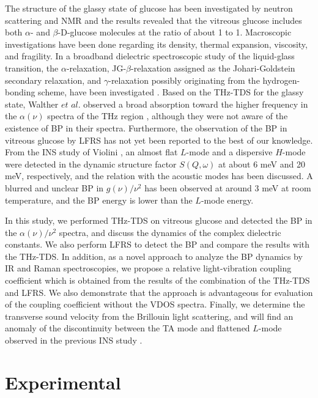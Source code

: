 \documentclass[%
 reprint,
superscriptaddress,
 amsmath,amssymb,
 aps,
prb,
]{revtex4-1}
\begin{document}
The structure of the glassy state of glucose has been investigated by neutron scattering and NMR \cite{Tromp1997} and the results revealed that the vitreous glucose includes both $\alpha$- and $\beta$-D-glucose molecules \cite{Brown1979, Chu1968} at the ratio of about 1 to 1.
Macroscopic investigations have been done regarding its density\cite{Parks1928}, thermal expansion\cite{Parks1934}, viscosity\cite{Parks1934, Ollett1990}, and fragility\cite{Angel1994}.
In a broadband dielectric spectroscopic study \cite{Chan1986, Nole1992, Kaminski2006} of the liquid-glass transition, the $\alpha$-relaxation, JG-$\beta$-relaxation assigned as the Johari-Goldstein secondary relaxation, and $\gamma$-relaxation possibly originating from the hydrogen-bonding scheme, have been investigated \cite{Kaminski2006}.
Based on the THz-TDS for the glassy state, Walther $et$ $al$. observed a broad absorption toward the higher frequency in the $\alpha(\nu)$ spectra of the THz region \cite{Walther2003}, although they were not aware of the existence of BP in their spectra.
Furthermore, the observation of the BP in vitreous glucose by LFRS  has not yet been reported to the best of our knowledge.
From the INS study of Violini \cite{Violini2012}, an almost flat $L$-mode and a dispersive $H$-mode were detected in the dynamic structure factor $S(Q,\omega)$ at about 6 meV and 20 meV, respectively, and the relation with the acoustic modes has been discussed. A blurred and unclear BP in $g(\nu)/\nu^{2}$ has been observed at around 3 meV at room temperature, and the BP energy is lower than the $L$-mode energy.

In this study, we performed THz-TDS on vitreous glucose and detected the BP in the $\alpha(\nu)/\nu^{2}$ spectra, and discuss the dynamics of the complex dielectric constants.
We also perform LFRS to detect the BP and compare the results with the THz-TDS.
In addition, as a novel approach to analyze the BP dynamics by IR and Raman spectroscopies, we propose a relative light-vibration coupling coefficient which is obtained from the results of the combination of the THz-TDS and LFRS.
We also demonstrate that the approach is advantageous for evaluation of the coupling coefficient without the VDOS spectra.
Finally, we determine the transverse sound velocity from the Brillouin light scattering, and will find an anomaly of the discontinuity between the TA mode and flattened $L$-mode observed in the previous INS study \cite{Violini2012}.


\section{Experimental}
\end{document}
